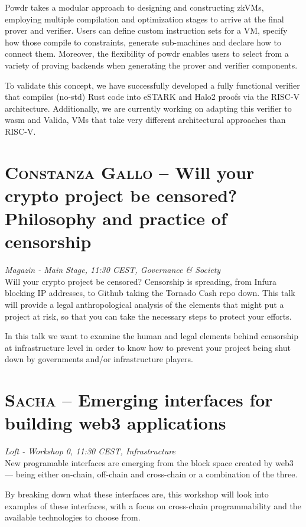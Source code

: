 Powdr takes a modular approach to designing and constructing zkVMs, employing multiple compilation and optimization stages to arrive at the final prover and verifier. Users can define custom instruction sets for a VM, specify how those compile to constraints, generate sub-machines and declare how to connect them. Moreover, the flexibility of powdr enables users to select from a variety of proving backends when generating the prover and verifier components.

To validate this concept, we have successfully developed a fully functional verifier that compiles (no-std) Rust code into eSTARK and Halo2 proofs via the RISC-V architecture. Additionally, we are currently working on adapting this verifier to wasm and Valida, VMs that take very different architectural approaches than RISC-V.
\par \clearpage
\section {\textsc{Constanza Gallo} -- Will your crypto project be censored? Philosophy and practice of censorship
} \noindent \textit {Magazin - Main Stage, 11:30 CEST, Governance \&
 Society
}\\[1em] Will your crypto project be censored? Censorship is spreading, from Infura blocking IP addresses, to Github taking the Tornado Cash repo down. This talk will provide a legal anthropological analysis of the elements that might put a project at risk, so that you can take the necessary steps to protect your efforts.
\par In this talk we want to examine the human and legal elements behind censorship at infrastructure level in order to know how to prevent your project being shut down by governments and/or infrastructure players.
\clearpage
\section {\textsc{Sacha} -- Emerging interfaces for building web3 applications
} \noindent \textit {Loft - Workshop 0, 11:30 CEST, Infrastructure
}\\[1em] New programable interfaces are emerging from the block space created by web3 --- being either on-chain, off-chain and cross-chain or a combination of the three.

By breaking down what these interfaces are, this workshop will look into examples of these interfaces, with a focus on cross-chain programmability and the available technologies to choose from.
\par \clearpage
